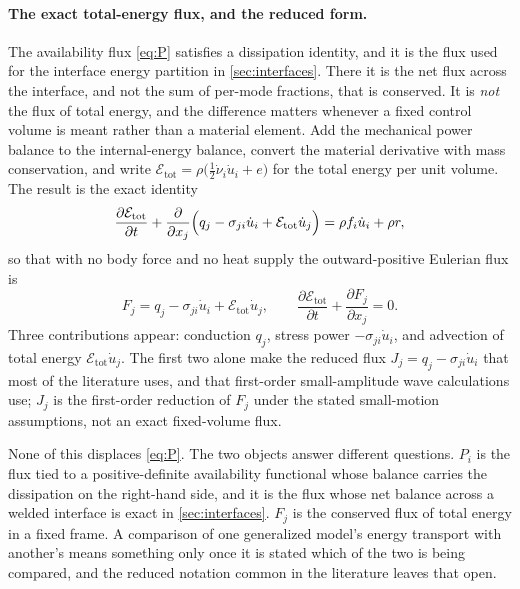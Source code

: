 \paragraph{The exact total-energy flux, and the reduced form.}
The availability flux \eqref{eq:P} satisfies a dissipation identity, and it is the flux used for the interface energy partition in \cref{sec:interfaces}. There it is the net flux across the interface, and not the sum of per-mode fractions, that is conserved. It is \emph{not} the flux of
total energy, and the difference matters whenever a fixed control volume is meant rather than a material
element. Add the mechanical power balance to the internal-energy balance, convert the material
derivative with mass conservation, and write $\mathcal E_{\mathrm{tot}}=\rho\bigl(\tfrac12\dot\nu_i\dot u_i+e\bigr)$ for the total energy per unit volume. The result is the exact identity
\begin{equation}\label{eq:exactflux}
\frac{\partial \mathcal E_{\mathrm{tot}}}{\partial t}
+\frac{\partial}{\partial x_j}\Bigl(q_j-\sigma_{ji}\dot u_i+\mathcal E_{\mathrm{tot}}\dot u_j\Bigr)
=\rho f_i\dot u_i+\rho r ,
\end{equation}
so that with no body force and no heat supply the outward-positive Eulerian flux is
\begin{equation}\label{eq:exactflux-balance}
F_j=q_j-\sigma_{ji}\dot u_i+\mathcal E_{\mathrm{tot}}\dot u_j,
\qquad
\frac{\partial \mathcal E_{\mathrm{tot}}}{\partial t}+\frac{\partial F_j}{\partial x_j}=0 .
\end{equation}
Three contributions appear: conduction $q_j$, stress power $-\sigma_{ji}\dot u_i$, and advection of
total energy $\mathcal E_{\mathrm{tot}}\dot u_j$. The first two alone make the reduced flux
$J_j=q_j-\sigma_{ji}\dot u_i$ that most of the literature uses, and that first-order small-amplitude
wave calculations use; $J_j$ is the first-order reduction of $F_j$ under the stated small-motion
assumptions, not an exact fixed-volume flux.

None of this displaces \eqref{eq:P}. The two objects answer different questions. $P_i$ is the flux tied
to a positive-definite availability functional whose balance carries the dissipation on the right-hand
side, and it is the flux whose net balance across a welded interface is exact in \cref{sec:interfaces}. $F_j$ is the
conserved flux of total energy in a fixed frame. A comparison of one generalized model's energy transport with
another's means something only once it is stated which of the two is being compared, and the
reduced notation common in the literature leaves that open.



